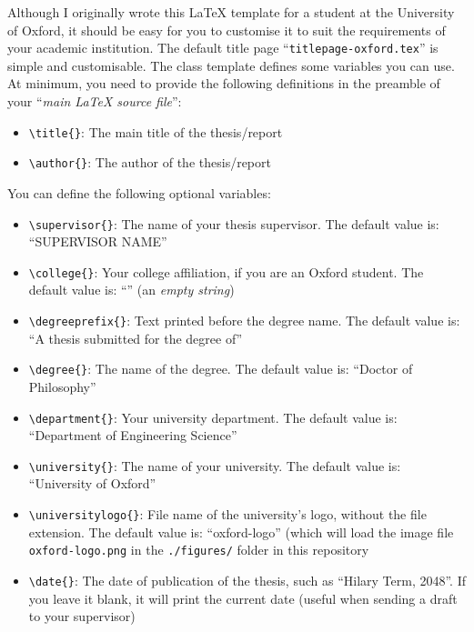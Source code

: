 Although I originally wrote this LaTeX template for a student at the University of Oxford, it should be easy for you to customise it to suit the requirements of your academic institution. The default title page ``\verb|titlepage-oxford.tex|'' is simple and customisable. The class template defines some variables you can use. At minimum, you need to provide the following definitions in the preamble of your ``\textit{main LaTeX source file}'':

\begin{itemize}

    \item \verb|\title{}|: The main title of the thesis/report

    \item \verb|\author{}|: The author of the thesis/report

\end{itemize}

You can define the following optional variables:

\begin{itemize}

    \item \verb|\supervisor{}|: The name of your thesis supervisor. The default value is: ``SUPERVISOR NAME''

    \item \verb|\college{}|: Your college affiliation, if you are an Oxford student. The default value is: ``'' (an \textit{empty string})

    \item \verb|\degreeprefix{}|: Text printed before the degree name. The default value is: ``A thesis submitted for the degree of''

    \item \verb|\degree{}|: The name of the degree. The default value is: ``Doctor of Philosophy''

    \item \verb|\department{}|: Your university department. The default value is: ``Department of Engineering Science''

    \item \verb|\university{}|: The name of your university. The default value is: ``University of Oxford''

    \item \verb|\universitylogo{}|: File name of the university's logo, without the file extension. The default value is: ``oxford-logo'' (which will load the image file \verb|oxford-logo.png| in the \verb|./figures/| folder in this repository

    \item \verb|\date{}|: The date of publication of the thesis, such as ``Hilary Term, 2048''. If you leave it blank, it will print the current date (useful when sending a draft to your supervisor)

\end{itemize}



